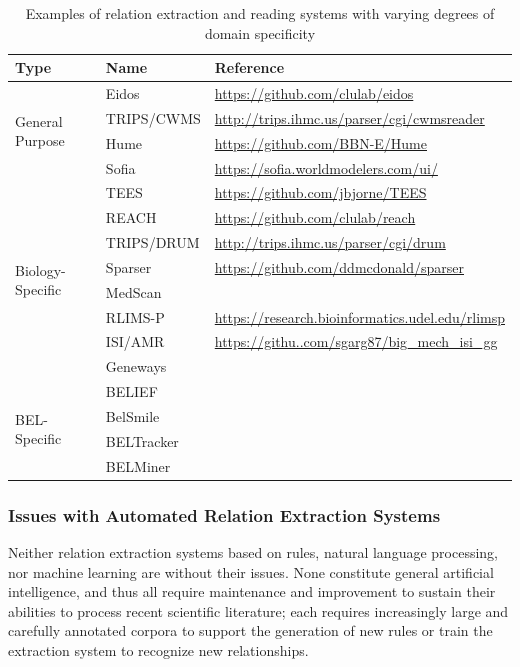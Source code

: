 \begin{table}
    \caption{Examples of relation extraction and reading systems with varying degrees of domain specificity}
    \label{tab:relation_extraction_systems}
    \centering
    \begin{tabular}{ l l l }
        Type & Name & Reference \\
        \hline
        \multirow{4}{*}{General Purpose}
        & Eidos & \url{https://github.com/clulab/eidos} \\
        & TRIPS/CWMS & \url{http://trips.ihmc.us/parser/cgi/cwmsreader} \\
        & Hume & \url{https://github.com/BBN-E/Hume} \\
        & Sofia & \url{https://sofia.worldmodelers.com/ui/} \\
        \hline
        \multirow{8}{*}{Biology-Specific}
        & TEES & \url{https://github.com/jbjorne/TEES} \\
        & REACH & \url{https://github.com/clulab/reach} \\
        & TRIPS/DRUM & \url{http://trips.ihmc.us/parser/cgi/drum} \\
        & Sparser & \url{https://github.com/ddmcdonald/sparser} \\
        & MedScan &\cite{Novichkova2003} \\
        & RLIMS-P & \url{https://research.bioinformatics.udel.edu/rlimsp}  \\
        & ISI/AMR & \url{https://githu..com/sgarg87/big_mech_isi_gg} \\
        & Geneways &\cite{Rzhetsky2004} \\
        \hline
        \multirow{4}{*}{\ac{BEL}-Specific}
        & BELIEF &\cite{Madan2016} \\
        & BelSmile &\cite{Lai2016} \\
        & BELTracker &\cite{Rastegar-Mojarad2016} \\
        & BELMiner &\cite{Ravikumar2017} \\
    \end{tabular}
\end{table}

\subsubsection{Issues with Automated Relation Extraction Systems}

Neither relation extraction systems based on rules, natural language processing, nor machine learning are without their issues.
None constitute general artificial intelligence, and thus all require maintenance and improvement to sustain their abilities to process recent scientific literature; each requires increasingly large and carefully annotated corpora to support the generation of new rules or train the extraction system to recognize new relationships.

